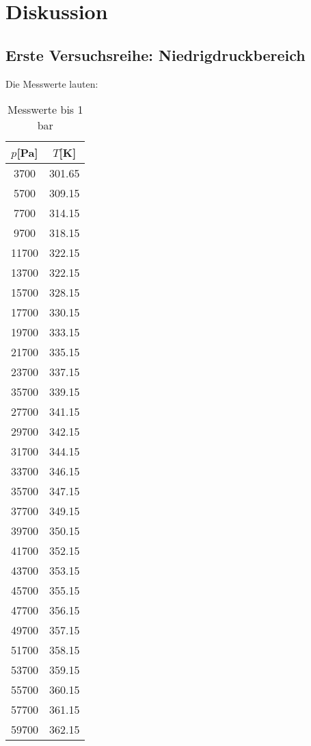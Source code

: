 \section{Diskussion}
\label{sec:Diskussion}
\subsection{Erste Versuchsreihe: Niedrigdruckbereich}
Die Messwerte lauten:
\begin{table}[H]
\centering
   \caption{Messwerte bis 1 bar}
   \label{tab:ndr}
   \begin{tabular}{c c}
   \toprule
    $p$[Pa] & $T$[K] \\
    \midrule
      3700 &   301.65 \\  
      5700 &   309.15 \\  
      7700 &   314.15 \\  
      9700 &   318.15 \\ 
      11700 &   322.15 \\ 
      13700 &   322.15 \\ 
      15700 &   328.15 \\ 
      17700 &   330.15 \\ 
      19700 &   333.15 \\ 
      21700 &   335.15 \\ 
      23700 &   337.15 \\ 
      35700 &   339.15 \\ 
      27700 &   341.15 \\ 
      29700 &   342.15 \\ 
      31700 &   344.15 \\ 
      33700 &   346.15 \\ 
      35700 &   347.15 \\ 
      37700 &   349.15 \\
      39700 &   350.15 \\ 
      41700 &   352.15 \\ 
      43700 &   353.15 \\ 
      45700 &   355.15 \\ 
      47700 &   356.15 \\ 
      49700 &   357.15 \\ 
      51700 &   358.15 \\ 
      53700 &   359.15 \\ 
      55700 &   360.15 \\ 
      57700 &   361.15 \\ 
      59700 &   362.15 \\ 

\end{tabular}
\end{table}
